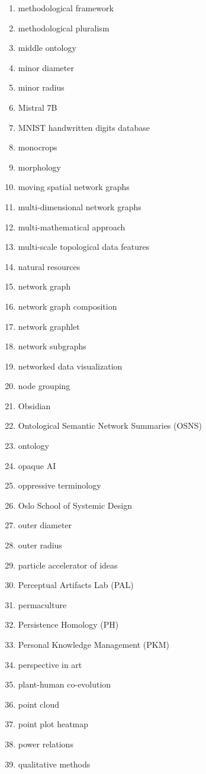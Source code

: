 \begin{multicols}{4}
\begin{enumerate}[label=\arabic*.]
\item methodological framework
\item methodological pluralism
\item middle ontology
\item minor diameter
\item minor radius
\item Mistral 7B
\item MNIST handwritten digits database
\item monocrops
\item morphology
\item moving spatial network graphs
\item multi-dimensional network graphs
\item multi-mathematical approach
\item multi-scale topological data features
\item natural resources
\item network graph
\item network graph composition
\item network graphlet
\item network subgraphs
\item networked data visualization
\item node grouping
\item Obsidian
\item Ontological Semantic Network Summaries (OSNS)
\item ontology
\item opaque AI
\item oppressive terminology
\item Oslo School of Systemic Design
\item outer diameter
\item outer radius
\item particle accelerator of ideas
\item Perceptual Artifacts Lab (PAL)
\item permaculture
\item Persistence Homology (PH)
\item Personal Knowledge Management (PKM)
\item perspective in art
\item plant-human co-evolution
\item point cloud
\item point plot heatmap
\item power relations
\item qualitative methods

\end{enumerate}
\end{multicols}
